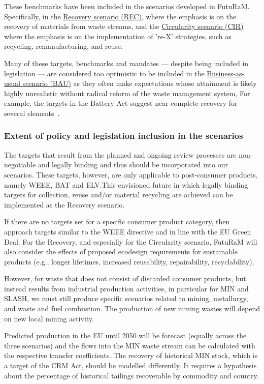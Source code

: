 These benchmarks have been included in the scenarios developed in FutuRaM. Specifically, in the \hyperref[sec:rec]{Recovery scenario (REC)}, where the emphasis is on the recovery of materials from waste streams, and the \hyperref[sec:cir]{Circularity scenario (CIR)} where the emphasis is on the implementation of 're-X' strategies, such as recycling, remanufacturing, and reuse.

Many of these targets, benchmarks and mandates --- despite being included in legislation --- are considered too optimistic to be included in the \hyperref[sec:bau]{Business-as-usual scenario (BAU)} as they often make expectations whose attainment is likely highly unrealistic without radical reform of the waste management system, For example, the targets in the Battery Act suggest near-complete recovery for several elements~\cite{eu2020batt}.



\subsubsection{Extent of policy and legislation inclusion in the scenarios}

The targets that result from the planned and ongoing review processes are non-negotiable and legally binding and thus should be incorporated into our scenarios. These targets, however, are only applicable to post-consumer products, namely WEEE, BAT and ELV.\@ This envisioned future in which legally binding targets for collection, reuse and/or material recycling are achieved can be implemented as the Recovery scenario.

If there are no targets set for a specific consumer product category, then approach targets similar to the WEEE directive and in line with the EU Green Deal. For the Recovery, and especially for the Circularity scenario, FutuRaM will also consider the effects of proposed ecodesign requirements for sustainable products (e.g., longer lifetimes, increased reusability, repairability, recyclability).

However, for waste that does not consist of discarded consumer products, but instead results from industrial production activities, in particular for MIN and SLASH, we must still produce specific scenarios related to mining, metallurgy, and waste and fuel combustion. The production of new mining wastes will depend on new local mining activity.

Predicted production in the EU until 2050 will be forecast (equally across the three scenarios) and the flows into the MIN waste stream can be calculated with the respective transfer coefficients. The recovery of historical MIN stock, which is a target of the CRM Act, should be modelled differently. It requires a hypothesis about the percentage of historical tailings recoverable by commodity and country.

